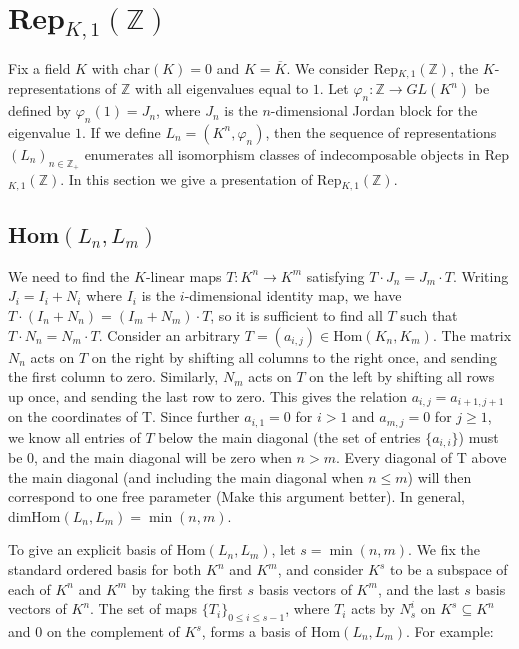 \documentclass[11pt]{article} %
\newcommand{\repz}{Rep$_{K,1}(\mathbb{Z})$}
\begin{document}
\iffalse

\section{\repz}
Fix a field $K$ with $\textrm{char}(K) = 0$ and $K = \overline{K}$. We consider \repz, the $K$-representations of $\mathbb{Z}$ with all eigenvalues equal to $1$. Let $\varphi_n: \mathbb{Z} \rightarrow GL(K^n)$ be defined by $\varphi_n(1) = J_n$, where $J_n$ is the $n$-dimensional Jordan block for the eigenvalue $1$. If we define $L_n = (K^n,\varphi_n)$, then the sequence of representations $(L_n)_{n \in \mathbb{Z}_+}$ enumerates all isomorphism classes of indecomposable objects in \repz. In this section we give a presentation of \repz.

\subsection{Hom$(L_n,L_m)$}
We need to find the $K$-linear maps $T:K^n \rightarrow K^m$ satisfying $T \cdot J_n = J_m \cdot T$. Writing $J_i = I_i + N_i$ where $I_i$ is the $i$-dimensional identity map, we have $T \cdot (I_n + N_n) = (I_m + N_m) \cdot T$, so it is sufficient to find all $T$ such that $T \cdot N_n = N_m \cdot T$. Consider an arbitrary $T=\left(a_{i,j}\right) \in \text{Hom}(K_n,K_m)$. The matrix $N_n$ acts on $T$ on the right by shifting all columns to the right once, and sending the first column to zero. Similarly, $N_m$ acts on $T$ on the left by shifting all rows up once, and sending the last row to zero. This gives the relation $a_{i,j} = a_{i+1,j+1}$ on the coordinates of T. Since further $a_{i,1}=0$ for $i > 1$ and $a_{m,j} = 0$ for $j \geq 1$, we know all entries of $T$ below the main diagonal (the set of entries $\{a_{i,i}\}$) must be $0$, and the main diagonal will be zero when $n > m$. Every diagonal of T above the main diagonal (and including the main diagonal when $n \leq m$) will then correspond to one free parameter (Make this argument better). In general, dimHom$(L_n,L_m)=\min(n,m)$.

To give an explicit basis of Hom$(L_n,L_m)$, let $s = \min(n,m)$. We fix the standard ordered basis for both $K^n$ and $K^m$, and consider $K^s$ to be a subspace of each of $K^n$ and $K^m$ by taking the first $s$ basis vectors of $K^m$, and the last $s$ basis vectors of $K^n$. The set of maps $\{T_i\}_{0 \leq i \leq s-1}$, where $T_i$ acts by $N_s^i$ on $K^s \subseteq K^n$ and $0$ on the complement of $K^s$, forms a basis of Hom$(L_n,L_m)$. For example: 
\end{document}
